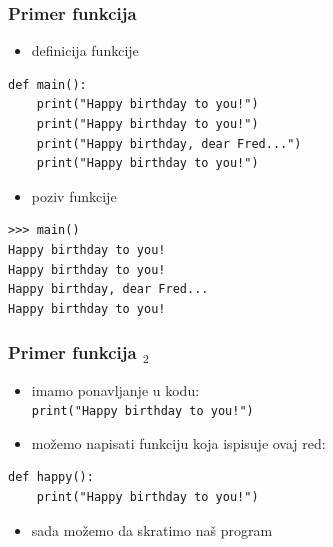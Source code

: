 \documentclass[compress]{beamer}
\begin{document}

\begin{frame}[fragile]
  \frametitle{Primer funkcija}
  \begin{itemize}
    \item definicija funkcije
  \end{itemize}
\begin{verbatim}
def main():
    print("Happy birthday to you!")
    print("Happy birthday to you!")
    print("Happy birthday, dear Fred...")
    print("Happy birthday to you!")
\end{verbatim}
  \begin{itemize}
    \item poziv funkcije
  \end{itemize}
\begin{verbatim}
>>> main()
Happy birthday to you!
Happy birthday to you!
Happy birthday, dear Fred...
Happy birthday to you!
\end{verbatim}
\end{frame}

\begin{frame}[fragile]
  \frametitle{Primer funkcija $_2$}
  \begin{itemize}
    \item imamo ponavljanje u kodu: \\
      \texttt{print("Happy birthday to you!")}
    \item možemo napisati funkciju koja ispisuje ovaj red:
  \end{itemize}
\begin{verbatim}
def happy():
    print("Happy birthday to you!")
\end{verbatim}
  \begin{itemize}
    \item sada možemo da skratimo naš program
  \end{itemize}
\end{frame}
\end{document}
